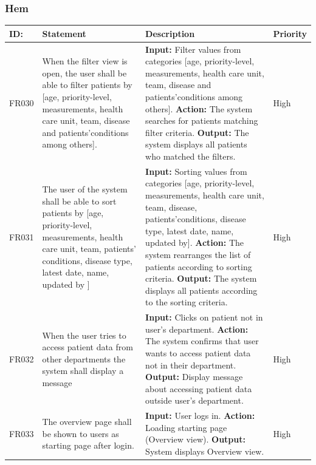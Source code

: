 \documentclass{scrreprt}
\begin{document}
\subsubsection{Hem}
\begin{center}
\begin{tabularx}{\linewidth}{| l | X | X | l |}
\hline
\textbf{ID:} & \textbf{Statement} & \textbf{Description} & \textbf{Priority} \\ 
\hline
FR030 & When the filter view is open, the user shall be able to filter patients by [age, priority-level, measurements, health care unit, team, disease and patients’conditions among others].  & \textbf{Input:} Filter values from categories [age, priority-level, measurements, health care unit, team, disease and patients’conditions among others].
\newline \textbf{Action:} The system searches for patients matching filter criteria.
\newline \textbf{Output:} The system displays all patients who matched the filters. & High \\ 
\hline
FR031 & The user of the system shall be able to sort patients by [age, priority-level, measurements, health care unit, team, patients’ conditions, disease type, latest date, name, updated by ] & \textbf{Input:} Sorting values from categories [age, priority-level, measurements, health care unit, team, disease, patients’conditions, disease type, latest date, name, updated by].
\newline \textbf{Action:} The system rearranges the list of patients according to sorting criteria.
\newline \textbf{Output:} The system displays all patients according to the sorting criteria. & High \\ 
\hline
FR032 & When the user tries to access patient data from other departments the system shall display a message & \textbf{Input:} Clicks on patient not in user's department.
\newline \textbf{Action:} The system confirms that user wants to access patient data not in their department.
\newline \textbf{Output:} Display message about accessing patient data outside user's department. & High \\ 
\hline
FR033 & The overview page shall be shown to users as starting page after login. & \textbf{Input:} User logs in.
\newline \textbf{Action:} Loading starting page (Overview view).
\newline \textbf{Output:} System displays Overview view. & High \\ 

\end{tabularx}
\end{center}
\end{document}
